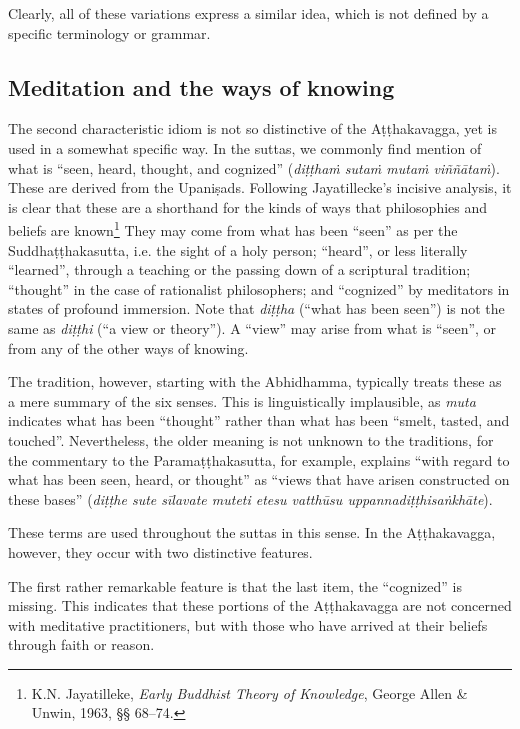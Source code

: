 \documentclass[12pt,openany]{book}%
\begin{document}
Clearly, all of these variations express a similar idea, which is not defined by a specific terminology or grammar.

\subsection*{Meditation and the ways of knowing}

The second characteristic idiom is not so distinctive of the \textsanskrit{Aṭṭhakavagga}, yet is used in a somewhat specific way. In the suttas, we commonly find mention of what is “seen, heard, thought, and cognized” (\textit{\textsanskrit{diṭṭhaṁ} \textsanskrit{sutaṁ} \textsanskrit{mutaṁ} \textsanskrit{viññātaṁ}}). These are derived from the \textsanskrit{Upaniṣads}. Following Jayatillecke’s incisive analysis, it is clear that these are a shorthand for the kinds of ways that philosophies and beliefs are known\footnote{K.N. Jayatilleke, \textit{Early Buddhist Theory of Knowledge}, George Allen \& Unwin, 1963, §§ 68–74. } They may come from what has been “seen” as per the \textsanskrit{Suddhaṭṭhakasutta}, i.e. the sight of a holy person; “heard”, or less literally “learned”, through a teaching or the passing down of a scriptural tradition; “thought” in the case of rationalist philosophers; and “cognized” by meditators in states of profound immersion. Note that \textit{\textsanskrit{diṭṭha}} (“what has been seen”) is not the same as \textit{\textsanskrit{diṭṭhi}} (“a view or theory”). A “view” may arise from what is “seen”, or from any of the other ways of knowing.

The tradition, however, starting with the Abhidhamma, typically treats these as a mere summary of the six senses. This is linguistically implausible, as \textit{muta} indicates what has been “thought” rather than what has been “smelt, tasted, and touched”. Nevertheless, the older meaning is not unknown to the traditions, for the commentary to the \textsanskrit{Paramaṭṭhakasutta}, for example, explains “with regard to what has been seen, heard, or thought” as “views that have arisen constructed on these bases” (\textit{\textsanskrit{diṭṭhe} sute \textsanskrit{sīlavate} muteti etesu \textsanskrit{vatthūsu} \textsanskrit{uppannadiṭṭhisaṅkhāte}}).

These terms are used throughout the suttas in this sense. In the \textsanskrit{Aṭṭhakavagga}, however, they occur with two distinctive features.

The first rather remarkable feature is that the last item, the “cognized” is missing. This indicates that these portions of the \textsanskrit{Aṭṭhakavagga} are not concerned with meditative practitioners, but with those who have arrived at their beliefs through faith or reason.
\end{document}
